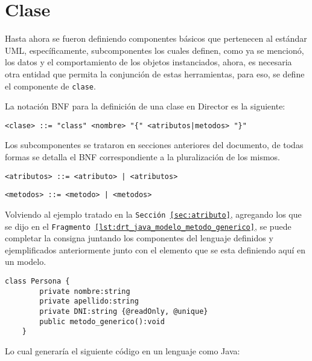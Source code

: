 \section{Clase}
\label{sec:clase}
Hasta ahora se fueron definiendo componentes básicos que pertenecen al estándar
UML, específicamente, subcomponentes los cuales definen, como ya se mencionó,
los datos y el comportamiento de los objetos instanciados, ahora, es necesaria
otra entidad que permita la conjunción de estas herramientas, para eso, se
define el componente de \texttt{clase}.

La notación BNF para la definición de una clase en Director es la siguiente:

\begin{lstlisting}[caption={BNF - Clase}, basicstyle=\footnotesize\ttfamily]
  <clase> ::= "class" <nombre> "{" <atributos|metodos> "}"
\end{lstlisting}

Los subcomponentes se trataron en secciones anteriores del documento, de todas
formas se detalla el BNF correspondiente a la pluralización de los mismos.

\begin{lstlisting}[basicstyle=\footnotesize\ttfamily]
  <atributos> ::= <atributo> | <atributos>
\end{lstlisting}

\begin{lstlisting}[basicstyle=\footnotesize\ttfamily]
  <metodos> ::= <metodo> | <metodos>
\end{lstlisting}

Volviendo al ejemplo tratado en la \texttt{Sección \ref{sec:atributo}},
agregando los que se dijo en el \texttt{Fragmento
\ref{lst:drt_java_modelo_metodo_generico}},
se puede completar la consigna juntando los componentes del lenguaje definidos
y ejemplificados anteriormente junto con el elemento que se esta
definiendo aquí en un modelo.

\begin{lstlisting}[caption={Director - Adhiere componente clase al ejemplo},
basicstyle=\footnotesize\ttfamily, label=lst:drt_java_clase]
	class Persona {
		private nombre:string
		private apellido:string
		private DNI:string {@readOnly, @unique}
		public metodo_generico():void
	}
\end{lstlisting}

Lo  cual generaría el siguiente código en un lenguaje como Java:

